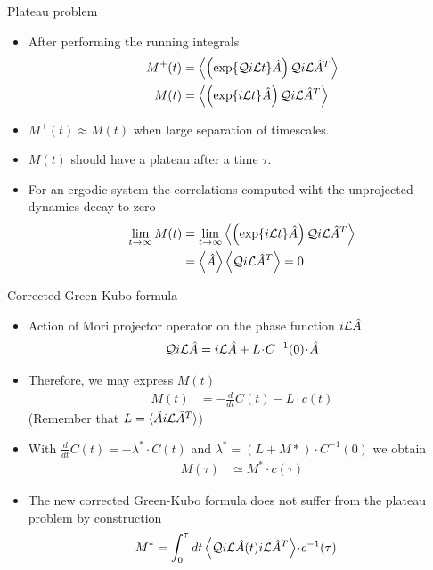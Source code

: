 \documentclass{beamer}
\newcommand{\esc}{\!\cdot\!}
\newcommand{\llangle}{\left\langle}
\newcommand{\rrangle}{\right\rangle}
\begin{document}
\begin{frame}{Plateau problem}
  \begin{itemize}
    \item After performing the running integrals
\begin{align}
M^+(t)&=
  \llangle\left(\exp\{{\cal Q}i{\cal L}t\}  \hat{A}\right){\cal Q}i{\cal L}\hat{A}^{T} \rrangle
\nonumber\\
M(t)&=
  \llangle\left(\exp\{i{\cal L}t\}  \hat{A}\right){\cal Q}i{\cal L}\hat{A}^{T} \rrangle
\nonumber
\end{align}
\item $M^+(t)\approx M(t)$ when large separation of timescales. 
\item $M(t)$ should have a plateau after a time $\tau$.
\item For an ergodic system the correlations computed wiht the unprojected dynamics decay to zero
\begin{align}
  \lim_{t\to\infty}M(t)&= \lim_{t\to\infty} \llangle\left(\exp\{i{\cal L}t\}  \hat{A}\right){\cal Q}i{\cal L}\hat{A}^{T} \rrangle
  \nonumber \\
  &=
 \llangle  \hat{A}\rrangle\llangle{\cal Q}i{\cal L}\hat{A}^{T} \rrangle=0
 \nonumber
\end{align}
    \end{itemize}
\end{frame}

\begin{frame}{Corrected Green-Kubo formula}
  \begin{itemize}
    \item  
Action  of Mori projector  operator on the phase  function $i{\cal
  L}\hat{A}$
\begin{align}
{\cal Q} i{\cal L}\hat{A}  
=
i{\cal L}\hat{A}+L\esc C^{-1}(0)\esc \hat{A}  
\nonumber
\end{align}
\item Therefore, we may express $M(t)$
\begin{align}
M(t)&=-\frac{d}{dt}C(t)-L\esc c(t)
\nonumber
\end{align}
(Remember that $L=\langle \hat{A}i{\cal L}\hat{A}^T\rangle$)
\item With $\frac{d}{dt}C(t)=-\lambda^*\cdot C(t)$ and $\lambda^*=(L+M*)\cdot C^{-1}(0)$ we obtain 
\begin{align}
M(\tau)&\simeq M^*\esc c(\tau)
\nonumber
\end{align}
\item The \alert{new corrected Green-Kubo formula} does not suffer from the plateau problem by construction
\begin{align}
M^*&= \int_0^{\tau} dt \llangle {\cal Q} i{\cal L}\hat{A} (t)i{\cal L}\hat{A}^T\rrangle\esc  c^{-1}(\tau)
\nonumber
\end{align}
\end{itemize}
\end{frame}
\end{document}

